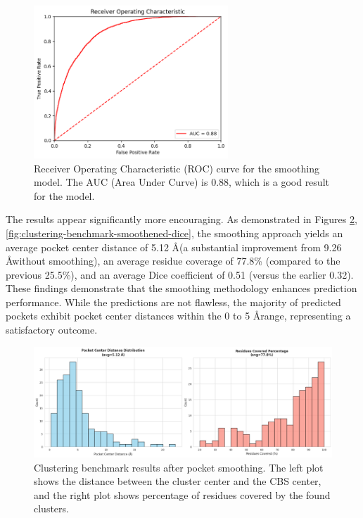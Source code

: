 \begin{figure}[htpb]
    \centering
    \includegraphics[width=0.65\textwidth]{img/smoothing-roc.png}
    \caption{Receiver Operating Characteristic (ROC) curve for the smoothing model. The AUC (Area Under Curve) is 0.88, which is a good result for the model.}
    \label{fig:smoothing-roc}
\end{figure}

The results appear significantly more encouraging. As demonstrated in Figures \ref{fig:clustering-benchmark-smoothened}, \ref{fig:clustering-benchmark-smoothened-dice}, the smoothing approach yields an average pocket center distance of 5.12 \AA (a substantial improvement from 9.26 \AA without smoothing), an average residue coverage of 77.8\% (compared to the previous 25.5\%), and an average Dice coefficient of 0.51 (versus the earlier 0.32). These findings demonstrate that the smoothing methodology enhances prediction performance. While the predictions are not flawless, the majority of predicted pockets exhibit pocket center distances within the 0 to 5 \AA range, representing a satisfactory outcome.

\begin{figure}[htbp]
    \centering
    \includegraphics[width=\textwidth]{img/smoothened-1.png}
    \caption{Clustering benchmark results after pocket smoothing. The left plot shows the distance between the cluster center and the CBS center, and the right plot shows percentage of residues covered by the found clusters.}
    \label{fig:clustering-benchmark-smoothened}
\end{figure}

